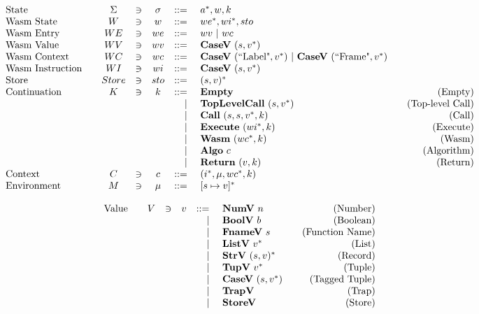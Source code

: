 \begin{align*}
\begin{array}{lcccrlr}
%
  \text{State}\quad& \Sigma &\ni& \sigma & ::=& ~ \seq a, w, k \\
%
  \text{Wasm State}\quad& W &\ni& w &::=& ~ \seq{we}, \seq{wi}, sto \\
%
  \text{Wasm Entry}\quad& WE &\ni& we &::=& ~ wv ~ | ~ wc \\
%
  \text{Wasm Value}\quad& WV &\ni& wv &::=& ~ \casev ~ (s, \seq v) \\
%
  \text{Wasm Context}\quad& WC &\ni& wc &::=& ~ \casev ~ (\text{``Label"}, \seq v) ~ | ~ \casev ~ (\text{``Frame"}, \seq v) \\
%
  \text{Wasm Instruction}\quad& WI &\ni& wi &::=& ~ \casev ~ (s, \seq v) \\
%
  \text{Store}\quad& Store &\ni& sto &::=& ~ \seq{(s, v)} \\
%
  \text{Continuation}\quad & K &\ni& k &::=& ~ \mt &\quad\text{(Empty)} \\
    &&&& | & ~ \toplevelcall ~ (s, \seq v) &\quad\text{(Top-level Call)} \\
    &&&& | & ~ \call ~ (s, s, \seq v, k) &\quad\text{(Call)} \\
    &&&& | & ~ \exe ~ (\seq{wi}, k) &\quad\text{(Execute)} \\
    &&&& | & ~ \wasm ~ (\seq{wc}, k) &\quad\text{(Wasm)} \\
    &&&& | & ~ \algo ~ c &\quad\text{(Algorithm)} \\
    &&&& | & ~ \ret ~ (v, k) &\quad\text{(Return)} \\
%
  \text{Context}\quad& C &\ni& c &::=& ~ (\seq i, \mu, \seq{wc}, k) \\
%
  \text{Environment}\quad& M &\ni& \mu &::=& ~ \seq{[s \mapsto v]} \\
\end{array}
\end{align*}

\newpage
\begin{align*}
\begin{array}{lcccrlr}
%
  \text{Value}\quad& V &\ni& v &::=& ~ \numv ~ n &\quad\text{(Number)} \\
    &&&& | & ~ \boolv ~ b &\quad\text{(Boolean)} \\
    &&&& | & ~ \fnamev ~ s &\quad\text{(Function Name)} \\
    &&&& | & ~ \listv ~ \seq v &\quad\text{(List)} \\
    &&&& | & ~ \strv ~ \seq{(s, v)} &\quad\text{(Record)} \\
    &&&& | & ~ \tupv ~ \seq v &\quad\text{(Tuple)} \\
    &&&& | & ~ \casev ~ (s, \seq v) &\quad\text{(Tagged Tuple)} \\
    &&&& | & ~ \trapv &\quad\text{(Trap)} \\
    &&&& | & ~ \storev &\quad\text{(Store)} \\
\end{array}
\end{align*}

